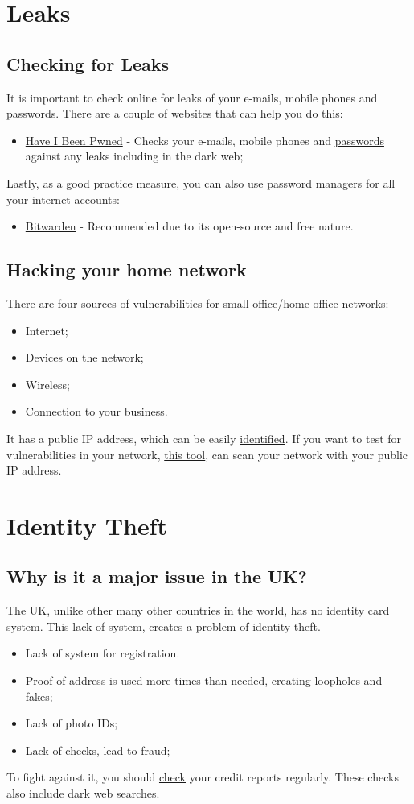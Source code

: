 \documentclass[11pt,a4paper]{report}
\begin{document}
\section{Leaks}
\subsection{Checking for Leaks}
It is important to check online for leaks of your e-mails, mobile phones and passwords. There are a couple of websites that can help you do this:
\begin{itemize}
    \item \href{http://haveibeenpwned.com}{Have I Been Pwned} - Checks your e-mails, mobile phones and \href{http://haveibeenpwned.com/Passwords}{passwords} against any leaks including in the dark web;
\end{itemize}
    Lastly, as a good practice measure, you can also use password managers for all your internet accounts: 
\begin{itemize}
    \item \href{https://github.com/bitwarden/clients}{Bitwarden} - Recommended  due to its open-source and free nature.
\end{itemize}

\subsection{Hacking your home network}
There are four sources of vulnerabilities for small office/home office networks:
\begin{itemize}
    \item Internet;
    \item Devices on the network;
    \item Wireless;
    \item Connection to your business.
\end{itemize}
It has a public IP address, which can be easily \href{https://whatismyipaddress.com}{identified}.
If you want to test for vulnerabilities in your network, \href{http://pentest-tools.com/home}{this tool}, can scan your network with your public IP address.
\section{Identity Theft}
\subsection{Why is it a major issue in the UK?}
The UK, unlike other many other countries in the world, has no identity card system. This lack of system, creates a problem of identity theft.
\begin{itemize}
    \item Lack of system for registration.
    \item Proof of address is used more times than needed, creating loopholes and fakes;
    \item Lack of photo IDs;
    \item Lack of checks, lead to fraud;
\end{itemize}
To fight against it, you should \href{https://clearscore.com}{check} your credit reports regularly. These checks also include dark web searches.
\end{document}
